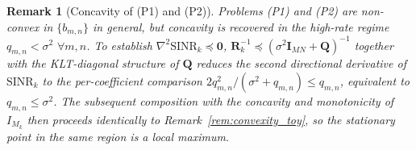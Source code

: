 \documentclass[10pt, twocolumn, comsoc]{IEEEtran}
\newtheorem{remark}{Remark}
\begin{document}

\begin{remark}[Concavity of (P1) and (P2)]
\label{rem:concavity_cran}
\normalfont
Problems (P1) and (P2) are non-convex in $\{b_{m,n}\}$ in general, 
but concavity is recovered in the high-rate regime $q_{m,n} < \sigma^2\,\, \forall m,n$. 
To establish $\nabla^2 \mathrm{SINR}_k \preceq \mathbf{0}$, 
$\mathbf{R}_k^{-1} \preceq (\sigma^2 \mathbf{I}_{MN} + \mathbf{Q})^{-1}$ 
together with the KLT-diagonal structure of $\mathbf{Q}$ reduces the 
second directional derivative of $\mathrm{SINR}_k$ to the 
per-coefficient comparison 
$2q_{m,n}^2/(\sigma^2+q_{m,n}) \le q_{m,n}$, equivalent to 
$q_{m,n} \le \sigma^2$. 
The subsequent composition with the concavity and monotonicity of $I_{M_k}$ then proceeds identically to Remark~\ref{rem:convexity_toy}, so the stationary point in the same region is a local maximum.
\end{remark}
\end{document}
